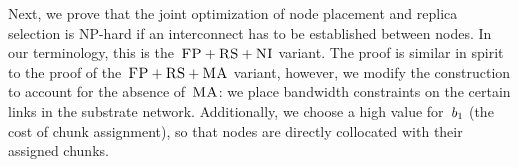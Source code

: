 
Next, we prove that the joint optimization of node placement and replica selection
is NP-hard if an interconnect has to be established between nodes.
In our terminology, this is the~$\textsc{FP}+\textsc{RS}+\textsc{NI}$ variant.
The proof is similar in spirit to the proof of the~$\textsc{FP}+\textsc{RS}+\textsc{MA}$ variant, however,
we modify the construction to account for the absence of~$\textsc{MA}$:
we place bandwidth constraints on the certain links in the substrate network.
Additionally, we choose
a high value for~$b_1$ (the cost of chunk assignment), so that nodes are directly collocated with
their assigned chunks.

